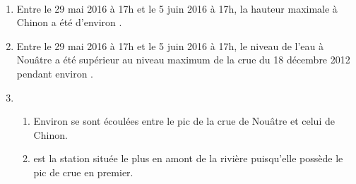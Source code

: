 \ \\ [-5mm]
\begin{enumerate}
   \item Entre le 29 mai 2016 à 17h et le 5 juin 2016 à 17h, la hauteur maximale à Chinon a été d'environ .
   \item Entre le 29 mai 2016 à 17h et le 5 juin 2016 à 17h, le niveau de l’eau à Nouâtre a été supérieur au niveau maximum de la crue du 18 décembre 2012 pendant environ .
   \item
   \begin{enumerate}
      \item Environ  se sont écoulées entre le pic de la crue de Nouâtre et celui de Chinon.
      \item {} est la station située le plus en amont de la rivière puisqu'elle possède le pic de crue en premier.
   \end{enumerate}
\end{enumerate}
